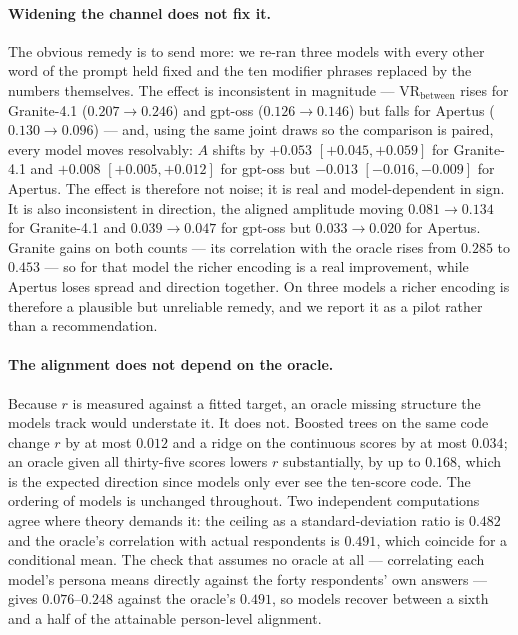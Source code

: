 \documentclass[11pt]{article}
\begin{document}
\paragraph{Widening the channel does not fix it.} The obvious remedy is to send
more: we re-ran three models with every other word of the prompt held fixed and
the ten modifier phrases replaced by the numbers themselves. The effect is
inconsistent in magnitude --- $\mathrm{VR}_\text{between}$ rises for Granite-4.1
($0.207\!\to\!0.246$) and gpt-oss ($0.126\!\to\!0.146$) but falls for Apertus
($0.130\!\to\!0.096$) --- and, using the same joint draws so the comparison is
paired, every model moves resolvably: $A$ shifts by $+0.053$
$[+0.045,+0.059]$ for Granite-4.1 and $+0.008$ $[+0.005,+0.012]$ for gpt-oss but
$-0.013$ $[-0.016,-0.009]$ for Apertus. The effect is therefore not noise; it is
real and model-dependent in sign. It is also inconsistent in direction, the aligned
amplitude moving $0.081\!\to\!0.134$ for Granite-4.1 and
$0.039\!\to\!0.047$ for gpt-oss but $0.033\!\to\!0.020$ for Apertus. Granite
gains on both counts --- its correlation with the oracle rises from $0.285$ to
$0.453$ --- so for that model the richer encoding is a real improvement, while
Apertus loses spread and direction together. On three models a richer encoding
is therefore a plausible but unreliable remedy, and we report it as a pilot
rather than a recommendation.

\paragraph{The alignment does not depend on the oracle.} Because $r$ is measured
against a fitted target, an oracle missing structure the models track would
understate it. It does not. Boosted trees on the same code change $r$ by at most
$0.012$ and a ridge on the continuous scores by at most $0.034$; an oracle given
all thirty-five scores lowers $r$ substantially, by up to $0.168$, which is the
expected direction since models only ever see the ten-score code. The ordering of
models is unchanged throughout. Two independent computations agree where theory
demands it: the ceiling as a standard-deviation ratio is $0.482$ and the oracle's
correlation with actual respondents is $0.491$, which coincide for a conditional
mean. The check that assumes no oracle at all --- correlating each model's persona
means directly against the forty respondents' own answers --- gives
$0.076$--$0.248$ against the oracle's $0.491$, so models recover between a sixth
and a half of the attainable person-level alignment.
\end{document}
